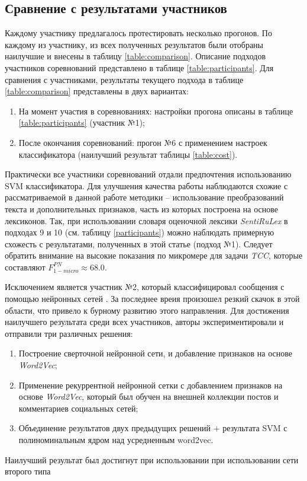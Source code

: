 \subsection{Сравнение с результатами участников}
Каждому участнику предлагалось протестировать несколько прогонов.
По каждому из участнику, из всех полученных результатов были отобраны
наилучшие и внесены в таблицу \ref{table:comparison}.
Описание подходов участников соревнований представлено в таблице
\ref{table:participants}.
Для сравнения с участниками, результаты текущего подхода в таблице
\ref{table:comparison} представлены в двух вариантах:
\begin{enumerate}
    \item На момент участия в соревнованиях: настройки прогона описаны
        в таблице \ref{table:participants} (участник №1);
    \item После окончания соревнований: прогон №6 с применением настроек
        классификатора (наилучший результат таблицы \ref{table:cost}).
\end{enumerate}



Практически все участники соревнований отдали предпочтения использованию
SVM классификатора.
Для улучшения качества работы наблюдаются схожие с рассматриваемой в данной
работе методики -- использование преобразований текста и
дополнительных признаков, часть из которых построена на основе лексиконов.
Так, при использовании словаря оценочной лексики {\it SentiRuLex} в подходах 9 и 10
(см. таблицу \ref{participants}) можно наблюдать примерную схожесть с результатами,
полученных в этой статье (подход №1).
Следует обратить внимание на высокие показания по микромере для задачи {\it TCC},
которые составляют  $F_{1-micro}^{PN} \approx 68.0$.

Исключением является участник №2, который классифицировал сообщения с помощью
нейронных сетей \cite{neuralNetworks}.
За последнее вреия произошел резкий скачок в этой области, что привело
к бурному развитию этого направления.
Для достижения наилучшего результата среди всех участников, авторы
экспериментировали и отправили три различных решения:
\begin{enumerate}
    \item Построение сверточной нейронной сети, и добавление признаков на
        основе {\it Word2Vec};
    \item Применение рекуррентной нейронной сетки с добавлением признаков
        на основе {\it Word2Vec}, который был обучен на внешней коллекции
        постов и комментариев социальных сетей;
    \item Объединение результатов двух предыдущих решений + результата
        SVM с полиноминальным ядром над усредненным word2vec.
\end{enumerate}

Наилучший результат был достигнут при использовании при использовании сети
второго типа
